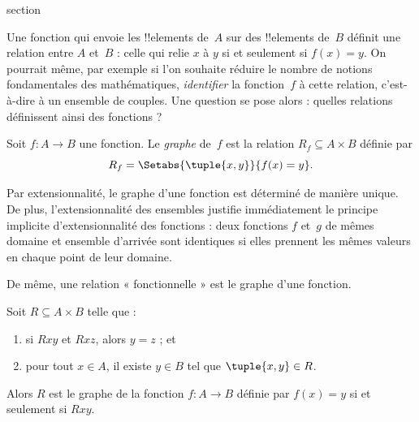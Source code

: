 \documentclass[11pt,a4paper,openany]{memoir}
\begin{document}
\endgroup



\begingroup
\expandafter\def\csname ol@sectioncs\endcsname{section}
\def\olfilename{functions-relations}




\begin{explain}
Une fonction qui envoie les !!{element}s de~$A$ sur des !!{element}s de~$B$
définit une relation entre $A$ et~$B$ : celle qui relie $x$ à $y$ si et
seulement si $f(x) = y$. On pourrait même, par exemple si l’on souhaite
réduire le nombre de notions fondamentales des mathématiques,
\emph{identifier} la fonction~$f$ à cette relation, c’est-à-dire à un
ensemble de couples. Une question se pose alors : quelles relations
définissent ainsi des fonctions ?
\end{explain}

\begin{defn} Soit $f\colon A \to B$ une fonction.
Le \emph{graphe} de~$f$ est la relation $R_f \subseteq A \times B$
définie par
\[
R_f = \Setabs{\tuple{x,y}}{f(x) = y}.
\]
\end{defn}

\begin{explain}
Par extensionnalité, le graphe d’une fonction est déterminé de manière
unique. De plus, l’extensionnalité des ensembles justifie immédiatement
le principe implicite d’extensionnalité des fonctions : deux fonctions
$f$ et~$g$ de mêmes domaine et ensemble d’arrivée sont identiques si
elles prennent les mêmes valeurs en chaque point de leur domaine.

De même, une relation « fonctionnelle » est le graphe d’une fonction.
\end{explain}

\begin{prop}
Soit $R \subseteq A \times B$ telle que :
\begin{enumerate}
\item si $Rxy$ et $Rxz$, alors $y = z$ ; et
\item pour tout $x \in A$, il existe $y \in B$ tel que
$\tuple{x,y} \in R$.
\end{enumerate}
Alors $R$ est le graphe de la fonction $f\colon A \to B$ définie par
$f(x) = y$ si et seulement si $Rxy$.
\end{prop}
\end{document}
